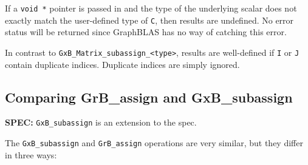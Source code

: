 \documentclass[12pt]{article}
\begin{document}
If a \verb'void *' pointer is passed in and the type of the underlying scalar
does not exactly match the user-defined type of \verb'C', then results are
undefined.  No error status will be returned since GraphBLAS has no way of
catching this error.

In contrast to \verb'GxB_Matrix_subassign_<type>', results are well-defined if
\verb'I' or \verb'J' contain duplicate indices.  Duplicate indices
are simply ignored.

\newpage
\subsection{Comparing {\sf GrB\_assign} and {\sf GxB\_subassign}} %
\label{compare_assign}

\begin{spec}
{\bf SPEC:} \verb'GxB_subassign' is an extension to the spec.
\end{spec}

The \verb'GxB_subassign' and \verb'GrB_assign' operations are very similar, but
they differ in three ways:
\end{document}
